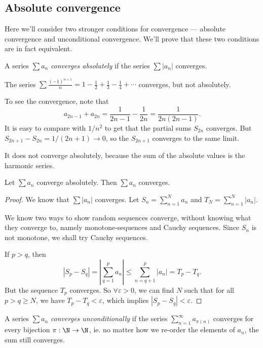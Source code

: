 \documentclass[a4paper]{article}
\begin{document}
\subsection{Absolute convergence}
Here we'll consider two stronger conditions for convergence --- absolute convergence and unconditional convergence. We'll prove that these two conditions are in fact equivalent.
\begin{defi}
  A series $\sum a_n$ \emph{converges absolutely} if the series $\sum |a_n|$ converges.
\end{defi}

\begin{eg}
  The series $\sum \frac{(-1)^{n + 1}}{n} = 1 - \frac{1}{2} + \frac{1}{3} - \frac{1}{4} + \cdots$ converges, but not absolutely.

  To see the convergence, note that
  \[
    a_{2n - 1} + a_{2n} = \frac{1}{2n - 1} - \frac{1}{2n} = \frac{1}{2n(2n- 1)}.
  \]
  It is easy to compare with $1/n^2$ to get that the partial sums $S_{2n}$ converges. But $S_{2n + 1} - S_{2n} = 1/(2n + 1) \to 0$, so the $S_{2n + 1}$ converges to the same limit.

  It does not converge absolutely, because the sum of the absolute values is the harmonic series.
\end{eg}

\begin{lemma}
  Let $\sum a_n$ converge absolutely. Then $\sum a_n$ converges.
\end{lemma}

\begin{proof}
  We know that $\sum |a_n|$ converges. Let $S_n = \sum_{n = 1}^N a_n$ and $T_N = \sum_{n = 1}^N |a_n|$.

  We know two ways to show random sequences converge, without knowing what they converge to, namely monotone-sequences and Cauchy sequences. Since $S_n$ is not monotone, we shall try Cauchy sequences.

  If $p > q$, then
  \[
    |S_p - S_q| = \left|\sum_{q = 1}^p a_n\right| \leq \sum_{n = q + 1}^p |a_n| = T_p - T_q.
  \]
  But the sequence $T_p$ converges. So $\forall \varepsilon > 0$, we can find $N$ such that for all $p > q \geq N$, we have $T_p - T_q < \varepsilon$, which implies $|S_p - S_q| < \varepsilon$.
\end{proof}

\begin{defi}
  A series $\sum a_n$ \emph{converges unconditionally} if the series $\sum_{n = 1}^{\infty} a_{\pi(n)}$ converges for every bijection $\pi: \N \to \N$, ie. no matter how we re-order the elements of $a_n$, the sum still converges.
\end{defi}
\end{document}
